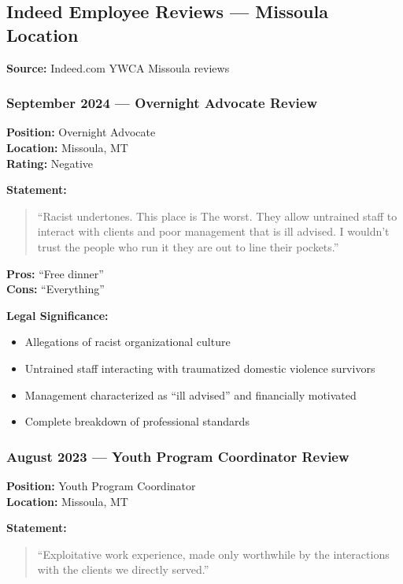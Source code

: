 \documentclass[11pt,letterpaper]{article}
\newenvironment{testimony}{%
    \begin{quote}\itshape\color{DarkGray}%
}{%
    \end{quote}%
}
\begin{document}
\subsection{Indeed Employee Reviews --- Missoula Location}

\textbf{Source:} Indeed.com YWCA Missoula reviews

\subsubsection{September 2024 --- Overnight Advocate Review}

\textbf{Position:} Overnight Advocate\\
\textbf{Location:} Missoula, MT\\
\textbf{Rating:} Negative

\textbf{Statement:}
\begin{testimony}
``Racist undertones. This place is The worst. They allow untrained staff to interact with clients and poor management that is ill advised. I wouldn't trust the people who run it they are out to line their pockets.''
\end{testimony}

\textbf{Pros:} ``Free dinner''\\
\textbf{Cons:} ``Everything''

\textbf{Legal Significance:}
\begin{itemize}[leftmargin=*]
\item Allegations of racist organizational culture
\item Untrained staff interacting with traumatized domestic violence survivors
\item Management characterized as ``ill advised'' and financially motivated
\item Complete breakdown of professional standards
\end{itemize}

\subsubsection{August 2023 --- Youth Program Coordinator Review}

\textbf{Position:} Youth Program Coordinator\\
\textbf{Location:} Missoula, MT

\textbf{Statement:}
\begin{testimony}
``Exploitative work experience, made only worthwhile by the interactions with the clients we directly served.''
\end{testimony}
\end{document}
